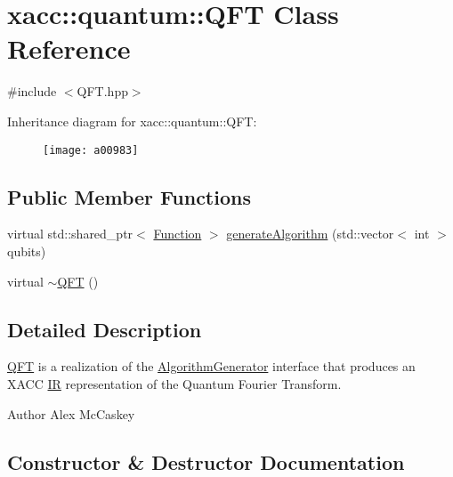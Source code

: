 \hypertarget{a00983}{}\section{xacc\+:\+:quantum\+:\+:Q\+FT Class Reference}
\label{a00983}


{\ttfamily \#include $<$Q\+F\+T.\+hpp$>$}

Inheritance diagram for xacc\+:\+:quantum\+:\+:Q\+FT\+:\begin{figure}[H]
\begin{center}
\leavevmode
\texttt{[image: a00983]}
\end{center}
\end{figure}
\subsection*{Public Member Functions}
\begin{DoxyCompactItemize}
\item 
virtual std\+::shared\+\_\+ptr$<$ \hyperlink{a01127}{Function} $>$ \hyperlink{a00983_ac093c288bc9fc069464fc3fd2cc0ac21}{generate\+Algorithm} (std\+::vector$<$ int $>$ qubits)
\item 
virtual \hyperlink{a00983_a2f585738386f9a3744498983cd1f094e}{$\sim$\+Q\+FT} ()
\end{DoxyCompactItemize}


\subsection{Detailed Description}
\hyperlink{a00983}{Q\+FT} is a realization of the \hyperlink{a01119}{Algorithm\+Generator} interface that produces an X\+A\+CC \hyperlink{a01151}{IR} representation of the Quantum Fourier Transform.

\begin{DoxyAuthor}{Author}
Alex Mc\+Caskey 
\end{DoxyAuthor}


\subsection{Constructor \& Destructor Documentation}
\mbox{\label{a00983_a2f585738386f9a3744498983cd1f094e}} 
